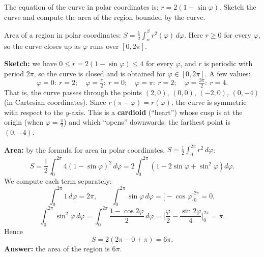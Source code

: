 
\begin{question}
The equation of the curve in polar coordinates is: $r=2(1-\sin\varphi)$.
Sketch the curve and compute the area of the region bounded by the curve.
\end{question}

\begin{hint}
Area of a region in polar coordinates: $S=\frac12\int_\alpha^\beta r^2(\varphi)\,d\varphi$. Here $r\ge0$ for every $\varphi$, so the curve closes up as $\varphi$ runs over $[0,2\pi]$.
\end{hint}

\begin{solution}
\textbf{Sketch:} we have $0\le r=2(1-\sin\varphi)\le 4$ for every $\varphi$, and $r$ is periodic with period $2\pi$, so the curve is closed and is obtained for $\varphi\in[0,2\pi]$. A few values:
\[ \varphi=0:\ r=2;\quad \varphi=\tfrac{\pi}{2}:\ r=0;\quad \varphi=\pi:\ r=2;\quad \varphi=\tfrac{3\pi}{2}:\ r=4. \]
That is, the curve passes through the points $(2,0)$, $(0,0)$, $(-2,0)$, $(0,-4)$ (in Cartesian coordinates). Since $r(\pi-\varphi)=r(\varphi)$, the curve is symmetric with respect to the $y$-axis. This is a \textbf{cardioid} (``heart'') whose cusp is at the origin (when $\varphi=\frac\pi2$) and which ``opens'' downwards: the farthest point is $(0,-4)$.

\textbf{Area:} by the formula for area in polar coordinates, $S=\frac12\int_0^{2\pi}r^2\,d\varphi$:
\[ S = \frac12\int_0^{2\pi}4(1-\sin\varphi)^2\,d\varphi = 2\int_0^{2\pi}\left(1-2\sin\varphi+\sin^2\varphi\right)d\varphi. \]
We compute each term separately:
\[ \int_0^{2\pi}1\,d\varphi=2\pi,\qquad \int_0^{2\pi}\sin\varphi\,d\varphi = \Big[-\cos\varphi\Big]_0^{2\pi}=0, \]
\[ \int_0^{2\pi}\sin^2\varphi\,d\varphi = \int_0^{2\pi}\frac{1-\cos2\varphi}{2}\,d\varphi = \Big[\frac{\varphi}{2}-\frac{\sin2\varphi}{4}\Big]_0^{2\pi} = \pi. \]
Hence
\[ S = 2\left(2\pi - 0 + \pi\right) = 6\pi. \]
\textbf{Answer:} the area of the region is $6\pi$.
\end{solution}
